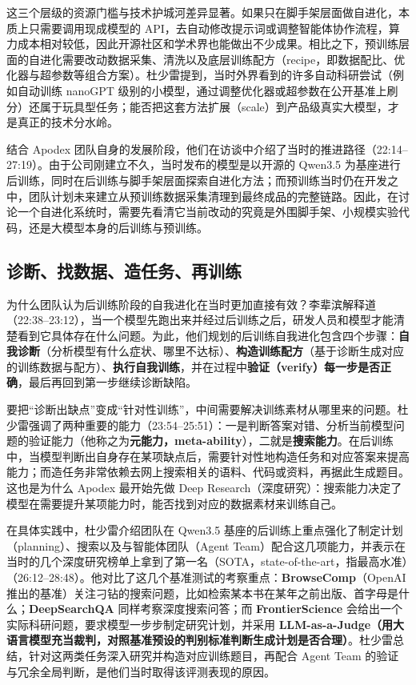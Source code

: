 \documentclass[UTF8,a4paper,11pt,fontset=fandol]{ctexart}
\begin{document}
这三个层级的资源门槛与技术护城河差异显著。如果只在脚手架层面做自进化，本质上只需要调用现成模型的 API，去自动修改提示词或调整智能体协作流程，算力成本相对较低，因此开源社区和学术界也能做出不少成果。相比之下，预训练层面的自进化需要改动数据采集、清洗以及底层训练配方（recipe，即数据配比、优化器与超参数等组合方案）。杜少雷提到，当时外界看到的许多自动科研尝试（例如自动训练 nanoGPT 级别的小模型，通过调整优化器或超参数在公开基准上刷分）还属于玩具型任务；能否把这套方法扩展（scale）到产品级真实大模型，才是真正的技术分水岭。

结合 Apodex 团队自身的发展阶段，他们在访谈中介绍了当时的推进路径（22:14–27:19）。由于公司刚建立不久，当时发布的模型是以开源的 Qwen3.5 为基座进行后训练，同时在后训练与脚手架层面探索自进化方法；而预训练当时仍在开发之中，团队计划未来建立从预训练数据采集清理到最终成品的完整链路。因此，在讨论一个自进化系统时，需要先看清它当前改动的究竟是外围脚手架、小规模实验代码，还是大模型本身的后训练与预训练。

\subsection{诊断、找数据、造任务、再训练}
为什么团队认为后训练阶段的自我进化在当时更加直接有效？李辈滨解释道（22:38–23:12），当一个模型先跑出来并经过后训练之后，研发人员和模型才能清楚看到它具体存在什么问题。为此，他们规划的后训练自我进化包含四个步骤：\textbf{自我诊断}（分析模型有什么症状、哪里不达标）、\textbf{构造训练配方}（基于诊断生成对应的训练数据与配方）、\textbf{执行自我训练}，并在过程中\textbf{验证（verify）每一步是否正确}，最后再回到第一步继续诊断缺陷。

要把“诊断出缺点”变成“针对性训练”，中间需要解决训练素材从哪里来的问题。杜少雷强调了两种重要的能力（23:54–25:51）：一是判断答案对错、分析当前模型问题的验证能力（他称之为\textbf{元能力，meta-ability}），二就是\textbf{搜索能力}。在后训练中，当模型判断出自身存在某项缺点后，需要针对性地构造任务和对应答案来提高能力；而造任务非常依赖去网上搜索相关的语料、代码或资料，再据此生成题目。这也是为什么 Apodex 最开始先做 Deep Research（深度研究）：搜索能力决定了模型在需要提升某项能力时，能否找到对应的数据素材来训练自己。

在具体实践中，杜少雷介绍团队在 Qwen3.5 基座的后训练上重点强化了制定计划（planning）、搜索以及与智能体团队（Agent Team）配合这几项能力，并表示在当时的几个深度研究榜单上拿到了第一名（SOTA，state-of-the-art，指最高水准）（26:12–28:48）。他对比了这几个基准测试的考察重点：\textbf{BrowseComp}（OpenAI 推出的基准）关注刁钻的搜索问题，比如检索某本书在某年之前出版、首字母是什么；\textbf{DeepSearchQA} 同样考察深度搜索问答；而 \textbf{FrontierScience} 会给出一个实际科研问题，要求模型一步步制定研究计划，并采用 \textbf{LLM-as-a-Judge（用大语言模型充当裁判，对照基准预设的判别标准判断生成计划是否合理）}。杜少雷总结，针对这两类任务深入研究并构造对应训练题目，再配合 Agent Team 的验证与冗余全局判断，是他们当时取得该评测表现的原因。
\end{document}
